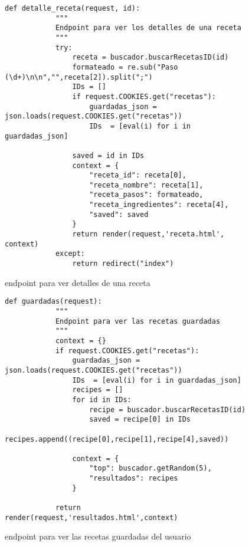 \begin{figure}[H]
    \begin{lstlisting}[style=consola]
        def detalle_receta(request, id):
            """
            Endpoint para ver los detalles de una receta
            """
            try:
                receta = buscador.buscarRecetasID(id)
                formateado = re.sub("Paso (\d+)\n\n","",receta[2]).split(";")
                IDs = []
                if request.COOKIES.get("recetas"):
                    guardadas_json = json.loads(request.COOKIES.get("recetas"))
                    IDs  = [eval(i) for i in guardadas_json]
                
                saved = id in IDs
                context = {
                    "receta_id": receta[0],
                    "receta_nombre": receta[1],
                    "receta_pasos": formateado,
                    "receta_ingredientes": receta[4],
                    "saved": saved
                }
                return render(request,'receta.html', context)
            except:
                return redirect("index")
    \end{lstlisting}
    \caption{\gls{endpoint} para ver detalles de una receta}
    \label{sni:django-detalles}
\end{figure}

\begin{figure}[H]
    \begin{lstlisting}[style=consola]
        def guardadas(request):
            """
            Endpoint para ver las recetas guardadas
            """
            context = {}
            if request.COOKIES.get("recetas"):
                guardadas_json = json.loads(request.COOKIES.get("recetas"))
                IDs  = [eval(i) for i in guardadas_json]
                recipes = []
                for id in IDs:
                    recipe = buscador.buscarRecetasID(id)
                    saved = recipe[0] in IDs
                    recipes.append((recipe[0],recipe[1],recipe[4],saved))
        
                context = {
                    "top": buscador.getRandom(5),
                    "resultados": recipes
                }
            
            return render(request,'resultados.html',context)
    \end{lstlisting}
    \caption{\gls{endpoint} para ver las recetas guardadas del usuario}
    \label{sni:django-detalles}
\end{figure}